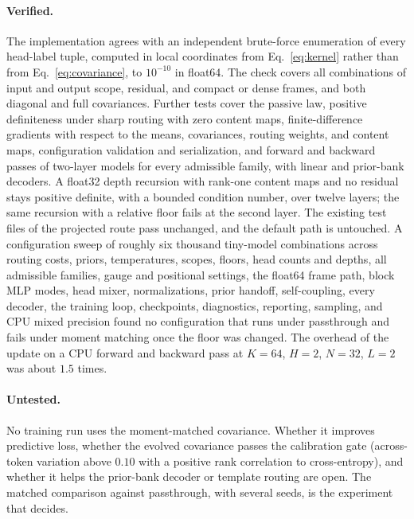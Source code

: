 \documentclass[11pt]{article}
\theoremstyle{definition}
\theoremstyle{remark}
\begin{document}
\paragraph{Verified.}
The implementation agrees with an independent brute-force enumeration of every head-label tuple, computed in local coordinates from Eq.~\eqref{eq:kernel} rather than from Eq.~\eqref{eq:covariance}, to $10^{-10}$ in float64. The check covers all combinations of input and output scope, residual, and compact or dense frames, and both diagonal and full covariances. Further tests cover the passive law, positive definiteness under sharp routing with zero content maps, finite-difference gradients with respect to the means, covariances, routing weights, and content maps, configuration validation and serialization, and forward and backward passes of two-layer models for every admissible family, with linear and prior-bank decoders. A float32 depth recursion with rank-one content maps and no residual stays positive definite, with a bounded condition number, over twelve layers; the same recursion with a relative floor fails at the second layer. The existing test files of the projected route pass unchanged, and the default path is untouched. A configuration sweep of roughly six thousand tiny-model combinations across routing costs, priors, temperatures, scopes, floors, head counts and depths, all admissible families, gauge and positional settings, the float64 frame path, block MLP modes, head mixer, normalizations, prior handoff, self-coupling, every decoder, the training loop, checkpoints, diagnostics, reporting, sampling, and CPU mixed precision found no configuration that runs under passthrough and fails under moment matching once the floor was changed. The overhead of the update on a CPU forward and backward pass at $K=64$, $H=2$, $N=32$, $L=2$ was about $1.5$ times.

\paragraph{Untested.}
No training run uses the moment-matched covariance. Whether it improves predictive loss, whether the evolved covariance passes the calibration gate (across-token variation above $0.10$ with a positive rank correlation to cross-entropy), and whether it helps the prior-bank decoder or template routing are open. The matched comparison against passthrough, with several seeds, is the experiment that decides.
\end{document}
